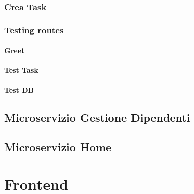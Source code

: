 \documentclass{report}
\begin{document}
\subsection*{Crea Task}

\subsection*{Testing routes}

\subsubsection*{Greet}
\subsubsection*{Test Task}
\subsubsection*{Test DB}

\section{Microservizio Gestione Dipendenti}

\section{Microservizio Home}

\chapter{Frontend}

	
\end{document}
